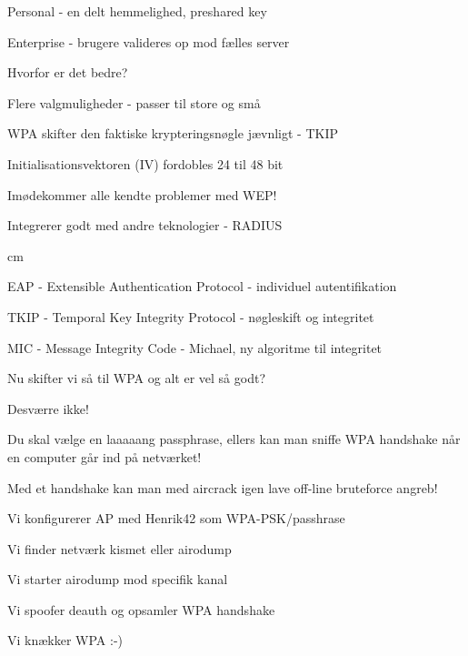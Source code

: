 \begin{list1}
\item Personal - en delt hemmelighed, preshared key
\item Enterprise - brugere valideres op mod fælles server
\item Hvorfor er det bedre?
\begin{list2}
\item Flere valgmuligheder - passer til store og små
\item WPA skifter den faktiske krypteringsnøgle jævnligt - TKIP 
\item Initialisationsvektoren (IV) fordobles 24 til 48 bit   
\item Imødekommer alle kendte problemer med WEP!
\item Integrerer godt med andre teknologier - RADIUS

 cm
\item EAP - Extensible Authentication Protocol - individuel autentifikation
\item TKIP - Temporal Key Integrity Protocol - nøgleskift og integritet
\item MIC - Message Integrity Code - Michael, ny algoritme til integritet
\end{list2}

\end{list1}



\begin{list1}
\item Nu skifter vi så til WPA og alt er vel så godt?  
\pause
\item Desværre ikke!
\item Du skal vælge en laaaaang passphrase, ellers kan man sniffe WPA
  handshake når en computer går ind på netværket!
\item Med et handshake kan man med aircrack igen lave off-line
  bruteforce angreb!
\end{list1}


\begin{list1}
\item Vi konfigurerer AP med Henrik42 som WPA-PSK/passhrase  
\item Vi finder netværk kismet eller airodump
\item Vi starter airodump mod specifik kanal
\item Vi spoofer deauth og opsamler WPA handshake
\item Vi knækker WPA :-)
\end{list1}

